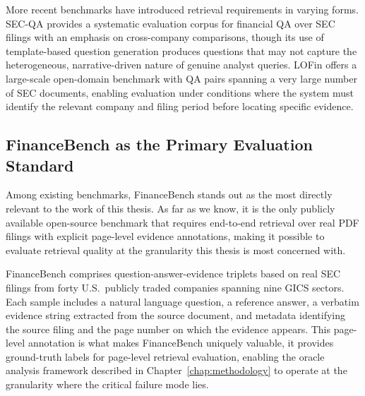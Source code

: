 \documentclass[12pt,twoside,maitrise]{dms}
\theoremstyle{definition}
\numberwithin{equation}{section}
\numberwithin{table}{chapter}
\numberwithin{figure}{chapter}
\begin{document}
More recent benchmarks have introduced retrieval requirements in varying forms. SEC-QA
\citep{lai2024secqa} provides a systematic evaluation corpus for financial QA over SEC
filings with an emphasis on cross-company comparisons, though its use of template-based
question generation produces questions that may not capture the heterogeneous,
narrative-driven nature of genuine analyst queries. LOFin \citep{choe2025hirec} offers a
large-scale open-domain benchmark with QA pairs spanning a very large number of SEC
documents, enabling evaluation under conditions where the system must identify the relevant company and filing period before locating specific evidence.

\subsection{FinanceBench as the Primary Evaluation Standard}

Among existing benchmarks, FinanceBench \citep{islam2023financebench} stands out as the
most directly relevant to the work of this thesis. As far as we know, it is the only publicly available open-source benchmark that requires end-to-end retrieval over real PDF filings with explicit page-level evidence annotations,
making it possible to evaluate retrieval quality at the granularity this thesis is most
concerned with.

FinanceBench comprises question-answer-evidence triplets based on real SEC filings from
forty U.S.\ publicly traded companies spanning nine GICS sectors. Each sample includes a
natural language question, a reference answer, a verbatim evidence string extracted from
the source document, and metadata identifying the source filing and the page number on
which the evidence appears. This page-level annotation is what makes FinanceBench
uniquely valuable, it provides ground-truth labels for page-level retrieval evaluation,
enabling the oracle analysis framework described in Chapter~\ref{chap:methodology} to
operate at the granularity where the critical failure mode lies.
\end{document}
